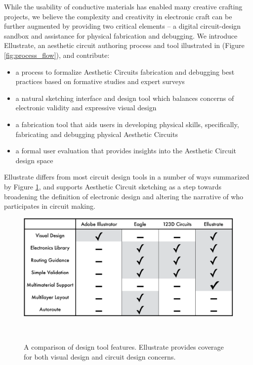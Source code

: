 \documentclass{sigchi}
\begin{document}
While the usability of conductive materials has enabled many creative crafting projects, we believe the complexity and creativity in electronic craft can be further augmented by providing two critical elements -- a digital circuit-design sandbox and assistance for physical fabrication and debugging. We introduce Ellustrate, an aesthetic circuit authoring process and tool illustrated in (Figure \ref{fig:process_flow}), and contribute: 
\begin{itemize}
    \item a process to formalize Aesthetic Circuits fabrication and debugging best practices based on formative studies and expert surveys
    \item a natural sketching interface and design tool which balances concerns of electronic validity and expressive visual design
    \item a fabrication tool that aids users in developing physical skills, specifically, fabricating and debugging physical Aesthetic Circuits
    \item a formal user evaluation that provides insights into the Aesthetic Circuit design space
\end{itemize}
Ellustrate differs from most circuit design tools in a number of ways summarized by Figure \ref{fig:comparison_table}, and supports Aesthetic Circuit sketching as a step towards broadening the definition of electronic design and altering the narrative of who participates in circuit making.




\begin{figure}[b]
\centering
  \includegraphics[width=1\columnwidth]{figures/comparative_table.pdf}
  \caption{A comparison of design tool features. Ellustrate provides coverage for both visual design and circuit design concerns. }~\label{fig:comparison_table}
  \vspace{-16pt}
\end{figure}
\end{document}

